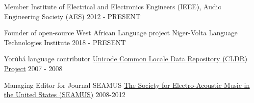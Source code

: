 

\begin{cventries}
	
  \cventry
    {Member} %
    {Institute of Electrical and Electronics Engineers (IEEE), Audio Engineering Society (AES)} %
    {} %
    {2012 - PRESENT} %
    {}

  \cventry
    {Founder of open-source West African Language project} %
    {Niger-Volta Language Technologies Institute} %
    {} %
    {2018 - PRESENT} %
    {}

  \cventry
    {Yor{\`u}b{\'a} language contributor} %
    {\href{http://cldr.unicode.org}{Unicode Common Locale Data Repository (CLDR) Project}} %
    {} %
    {2007 - 2008} %
    {}

  \cventry
    {Managing Editor for Journal SEAMUS} %
    {\href{https://www.seamusonline.org}{The Society for Electro-Acoustic Music in the United States (SEAMUS)}} %
    {} %
    {2008-2012} %
    {}
	
\end{cventries}
